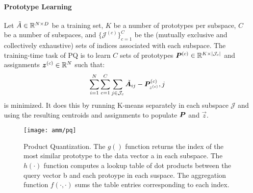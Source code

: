 \paragraph{Prototype Learning}

Let $\tilde{A} \in \mathbb{R}^{N \times D}$ be a training set, $K$ be a number of prototypes per subspace, $C$ be a number of subspaces, and $\{\mathcal{J}^{(c)}\}_{c=1}^C$ be the (mutually exclusive and collectively exhaustive) sets of indices associated with each subspace. The training-time task of PQ is to learn $C$ sets of prototypes $\bm{P}^{(c)} \in \mathbb{R}^{K \times |\mathcal{J}_c|}$ and assignments $\bm{z}^{(c)} \in \mathbb{R}^{N}$ such that:
\vspace{-1mm}
\begin{align}
    \sum_{i=1}^N \sum_{c=1}^C \sum_{j\in \mathcal{J}_c} \tilde{\bm{A}}_{ij} - \bm{P}^{(c)}_{z^{(c)}},j
\end{align}
\vspace{-.5mm}
is minimized. It does this by running K-means separately in each subspace $\mathcal{J}$ and using the resulting centroids and assignments to populate $\bm{P}$ and $\vec{z}$.

\begin{figure}[t]
\begin{center}
\texttt{[image: amm/pq]}
\caption{Product Quantization. The $g()$ function returns the index of the most similar prototype to the data vector a in each subspace. The $h(\cdot)$ function computes a lookup table of dot products between the query vector b and each protoype in each suspace. The aggregation function $f(\cdot,\cdot)$ sums the table entries corresponding to each index.}
\label{fig:pq}
\end{center}
\end{figure}




